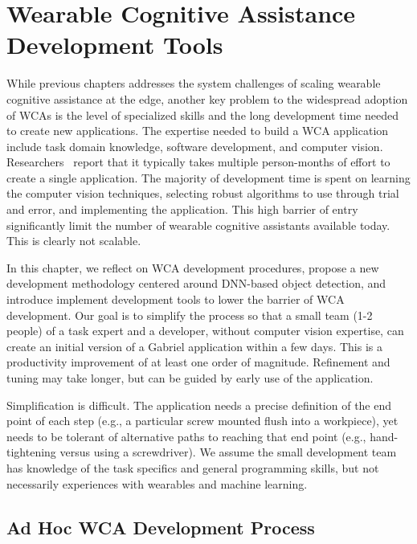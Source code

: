 \chapter{Wearable Cognitive Assistance Development Tools}

\label{chapter: dev}

While previous chapters addresses the system challenges of scaling wearable
cognitive assistance at the edge, another key problem to the widespread adoption
of WCAs is the level of specialized skills and the long development time needed
to create new applications. The expertise needed to build a WCA application
include task domain knowledge, software development, and computer vision.
Researchers~\cite{chen2018application} report that it typically takes multiple
person-months of effort to create a single application. The majority of
development time is spent on learning the computer vision techniques, selecting
robust algorithms to use through trial and error, and implementing the
application. This high barrier of entry significantly limit the number of
wearable cognitive assistants available today. This is clearly not scalable. 

In this chapter, we reflect on WCA development procedures, propose a new
development methodology centered around DNN-based object detection, and
introduce implement development tools to lower the barrier of WCA development.
Our goal is to simplify the process so that a small team (1-2 people) of a task
expert and a developer, without computer vision expertise, can create an initial
version of a Gabriel application within a few days. This is a productivity
improvement of at least one order of magnitude. Refinement and tuning may take
longer, but can be guided by early use of the application. 

Simplification is difficult. The application needs a precise definition of the
end point of each step (e.g., a particular screw mounted flush into a
workpiece), yet needs to be tolerant of alternative paths to reaching that end
point (e.g., hand-tightening versus using a screwdriver). We assume the small
development team has knowledge of the task specifics and general programming
skills, but not necessarily experiences with wearables and machine learning.

\section{Ad Hoc WCA Development Process}

